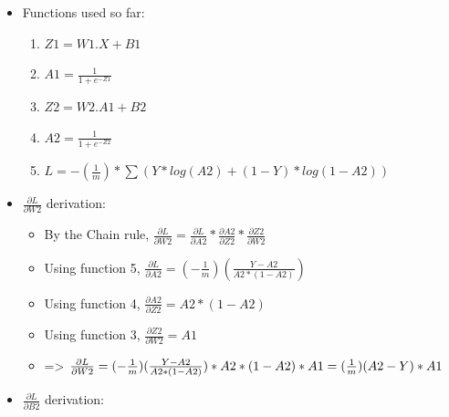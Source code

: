 \documentclass[10pt,a4paper]{article}
\begin{document}
\begin{itemize}
    \item Functions used so far:
    \begin{enumerate}
        \item $Z1 = W1 . X + B1$
        \item $A1 = \frac{1}{1+e^{-Z1}}$
        \item $Z2 = W2 . A1 + B2$
        \item $A2 = \frac{1}{1+e^{-Z2}}$
        \item $L = -(\frac{1}{m}) * \sum(Y * log(A2) + (1-Y) * log(1-A2))$
    \end{enumerate}
    \item $\frac{\partial{L}}{\partial{W2}}$ derivation:
    \begin{itemize}
        \item By the Chain rule, $\frac{\partial{L}}{\partial{W2}} = \frac{\partial{L}}{\partial{A2}} * \frac{\partial{A2}}{\partial{Z2}} * \frac{\partial{Z2}}{\partial{W2}}$
        \item Using function 5, $\frac{\partial{L}}{\partial{A2}} = (-\frac{1}{m})(\frac{Y-A2}{A2 * (1-A2)})$
        \item Using function 4, $\frac{\partial{A2}}{\partial{Z2}} = A2 * (1-A2)$
        \item Using function 3, $\frac{\partial{Z2}}{\partial{W2}} = A1$
        \item => $\frac{\partial{L}}{\partial{W2}} = (-\frac{1}{m})(\frac{Y-A2}{A2 * (1-A2)}) * A2 * (1-A2) * A1\\
              = (\frac{1}{m})(A2-Y) * A1$
    \end{itemize}
    \item $\frac{\partial{L}}{\partial{B2}}$ derivation:
\end{itemize}
\end{document}
